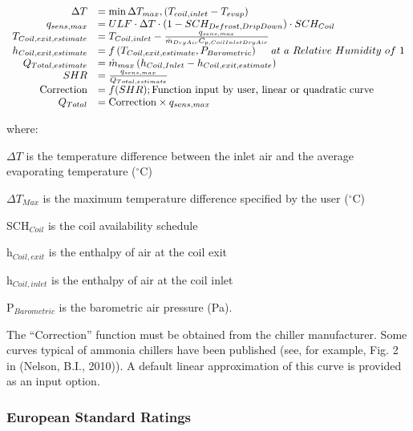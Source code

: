 \begin{equation}
  \begin{array}{rl}
                  \Delta T &= \min{ \Delta T_{max},\left(T_{coil,inlet} - T_{evap}\right)} \\
              q_{sens,max} &= ULF \cdot \Delta T \cdot \left(1 - SCH_{Defrost,DripDown}\right) \cdot SCH_{Coil} \\
    T_{Coil,exit,estimate} &= T_{Coil,inlet} - \frac{q_{sens,max}}{\dot{m}_{DryAir} C_{p,Coil Inlet Dry Air}} \\
    h_{Coil,exit,estimate} &= f\left(T_{Coil,exit,estimate},P_{Barometric}\right)~~~~at~a~Relative~Humidity~of~1 \\
        Q_{Total,estimate} &= \dot{m}_{max}\left(h_{Coil,Inlet} - h_{Coil,exit,estimate}\right) \\
                       SHR &= \frac{q_{sens,max}}{Q_{Total,estimate}} \\
         \text{Correction} &= f(SHR);\text{Function input by user, linear or quadratic curve} \\
                 Q_{Total} &= \text{Correction} \times q_{sens,max}
  \end{array}
\end{equation}

where:

\(\Delta T\) is the temperature difference between the inlet air and the average evaporating temperature (\(^{\circ}\)C)

\(\Delta T{}_{Max}\) is the maximum temperature difference specified by the user (\(^{\circ}\)C)

SCH\(_{Coil}\) is the coil availability schedule

h\(_{Coil,exit}\) is the enthalpy of air at the coil exit

h\(_{Coil,inlet}\) is the enthalpy of air at the coil inlet

P\(_{Barometric}\) is the barometric air pressure (Pa).

The ``Correction'' function must be obtained from the chiller manufacturer. Some curves typical of ammonia chillers have been published (see, for example, Fig. 2 in (Nelson, B.I., 2010)). A default linear approximation of this curve is provided as an input option.

\subsubsection{European Standard Ratings}\label{european-standard-ratings}

